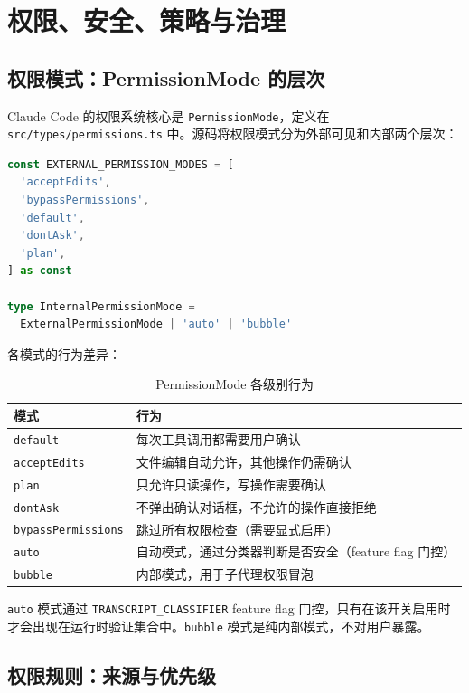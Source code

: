\chapter{权限、安全、策略与治理}

\section{权限模式：PermissionMode 的层次}

Claude Code 的权限系统核心是 \texttt{PermissionMode}，定义在 \texttt{src/types/permissions.ts} 中。源码将权限模式分为外部可见和内部两个层次：

\begin{lstlisting}[language=TypeScript]
const EXTERNAL_PERMISSION_MODES = [
  'acceptEdits',
  'bypassPermissions',
  'default',
  'dontAsk',
  'plan',
] as const

type InternalPermissionMode =
  ExternalPermissionMode | 'auto' | 'bubble'
\end{lstlisting}

各模式的行为差异：

\begin{table}[htbp]
\centering
\begin{tabularx}{\textwidth}{lX}
\toprule
\textbf{模式} & \textbf{行为} \\
\midrule
\texttt{default} & 每次工具调用都需要用户确认 \\
\texttt{acceptEdits} & 文件编辑自动允许，其他操作仍需确认 \\
\texttt{plan} & 只允许只读操作，写操作需要确认 \\
\texttt{dontAsk} & 不弹出确认对话框，不允许的操作直接拒绝 \\
\texttt{bypassPermissions} & 跳过所有权限检查（需要显式启用） \\
\texttt{auto} & 自动模式，通过分类器判断是否安全（feature flag 门控） \\
\texttt{bubble} & 内部模式，用于子代理权限冒泡 \\
\bottomrule
\end{tabularx}
\caption{PermissionMode 各级别行为}
\end{table}

\texttt{auto} 模式通过 \texttt{TRANSCRIPT\_CLASSIFIER} feature flag 门控，只有在该开关启用时才会出现在运行时验证集合中。\texttt{bubble} 模式是纯内部模式，不对用户暴露。

\section{权限规则：来源与优先级}

